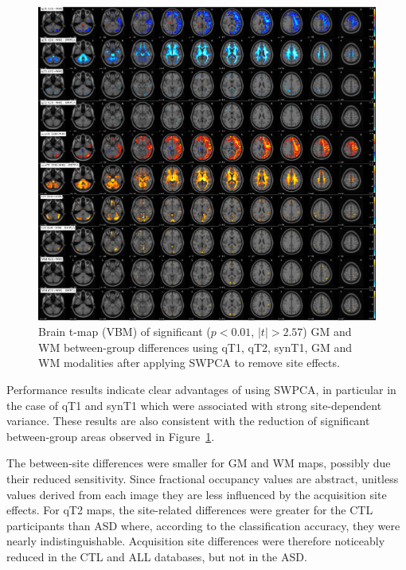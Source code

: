 \begin{figure}
	\centering
	\includegraphics[width=\linewidth]{Graphics/ch7/FIGURE03}
	\caption[Brain t-map (\acs{VBM}) of significant ($p<0.01$, $|t|>2.57$) \acs{GM} and \acs{WM} between-group differences using \acs{qT1}, \acs{qT2}, \acs{synT1}, \acs{GM} and \acs{WM} modalities after applying \acs{SWPCA} to remove site effects.]{Brain t-map (\ac{VBM}) of significant ($p<0.01$, $|t|>2.57$) \ac{GM} and \ac{WM} between-group differences using \ac{qT1}, \ac{qT2}, \ac{synT1}, \ac{GM} and \ac{WM} modalities after applying \ac{SWPCA} to remove site effects.}
	\label{fig:swpcaFIGURE03}
\end{figure}

Performance results indicate clear advantages of using \ac{SWPCA}, in
particular in the case of \ac{qT1} and \ac{synT1} which were associated with
strong site-dependent variance. These results are also consistent with
the reduction of significant between-group areas observed in Figure~\ref{fig:swpcaFIGURE03}.
	
The between-site differences were smaller for \ac{GM} and \ac{WM} maps, possibly
due their reduced sensitivity. Since fractional occupancy values are
abstract, unitless values derived from each image they are less
influenced by the acquisition site effects. For \ac{qT2} maps, the
site-related differences were greater for the CTL participants than \ac{ASD}
where, according to the classification accuracy, they were nearly
indistinguishable. Acquisition site differences were therefore
noticeably reduced in the CTL and ALL databases, but not in the \ac{ASD}.

